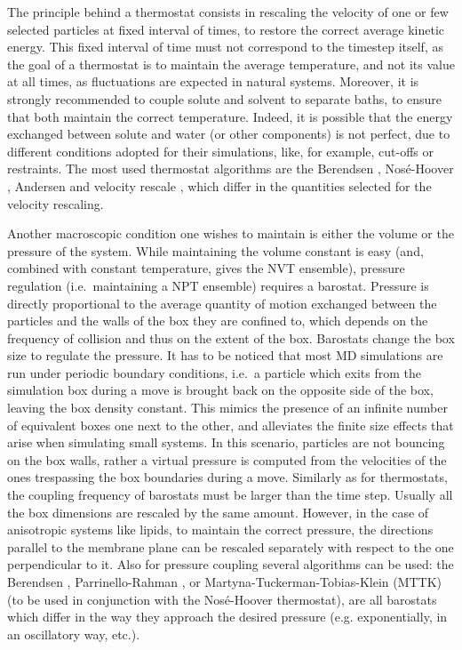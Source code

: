 The principle behind a thermostat consists in rescaling the velocity of one or few selected particles at fixed interval of times, to restore the correct average kinetic energy. This fixed interval of time must not correspond to the timestep itself, as the goal of a thermostat is to maintain the average temperature, and not its value at all times, as fluctuations are expected in natural systems.
%
Moreover, it is strongly recommended to couple solute and solvent to separate baths, to ensure that both maintain the correct temperature. Indeed, it is possible that the energy exchanged between solute and water (or other components) is not perfect, due to different conditions adopted for their simulations, like, for example, cut-offs or restraints.
%
The most used thermostat algorithms are the Berendsen \citep{Berendsen1984}, Nos\'{e}-Hoover \citep{Nose1983,Hoover1985}, Andersen \citep{Andersen1980} and velocity rescale \citep{Bussi2007}, which differ in the quantities selected for the velocity rescaling.

Another macroscopic condition one wishes to maintain is either the volume or the pressure of the system. While maintaining the volume constant is easy (and, combined with constant temperature, gives the NVT ensemble), pressure regulation (i.e.\ maintaining a NPT ensemble) requires a barostat.
%
Pressure is directly proportional to the average quantity of motion exchanged between the particles and the walls of the box they are confined to, which depends on the frequency of collision and thus on the extent of the box. Barostats change the box size to regulate the pressure.
%
It has to be noticed that most MD simulations are run under periodic boundary conditions, i.e.\ a particle which exits from the simulation box during a move is brought back on the opposite side of the box, leaving the box density constant. This mimics the presence of an infinite number of equivalent boxes one next to the other, and alleviates the finite size effects that arise when simulating small systems.
%
In this scenario, particles are not bouncing on the box walls, rather a virtual pressure is computed from the velocities of the ones trespassing the box boundaries during a move.
%
Similarly as for thermostats, the coupling frequency of barostats must be larger than the time step. Usually all the box dimensions are rescaled by the same amount. However, in the case of anisotropic systems like lipids, to maintain the correct pressure, the directions parallel to the membrane plane can be rescaled separately with respect to the one perpendicular to it.
%
Also for pressure coupling several algorithms can be used: the Berendsen \citep{Berendsen1984}, Parrinello-Rahman \citep{Parrinello1981}, or Martyna-Tuckerman-Tobias-Klein (MTTK) \citep{Martyna1996} (to be used in conjunction with the Nos\'{e}-Hoover thermostat), are all barostats which differ in the way they approach the desired pressure (e.g. exponentially, in an oscillatory way, etc.).


